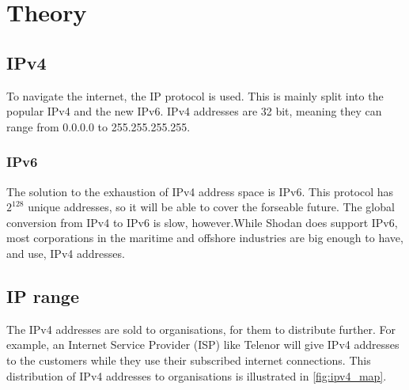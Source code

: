 \section{Theory}

\subsection{IPv4}
To navigate the internet, the IP protocol is used. This is mainly split into the popular IPv4 and the new IPv6. IPv4 addresses are 32 bit, meaning they can range from 0.0.0.0 to 255.255.255.255. 

\subsubsection{IPv6}
The solution to the exhaustion of IPv4 address space is IPv6. This protocol has $2^{128}$ unique addresses, so it will be able to cover the forseable future. The global conversion from IPv4 to IPv6 is slow, however.While Shodan does support IPv6, most corporations in the maritime and offshore industries are big enough to have, and use, IPv4 addresses. 


\subsection{IP range}
 The IPv4 addresses are sold to organisations, for them to distribute further. For example, an Internet Service Provider (ISP) like Telenor will give IPv4 addresses to the customers while they use their subscribed internet connections. This distribution of IPv4 addresses to organisations is illustrated in \cref{fig:ipv4_map}.

